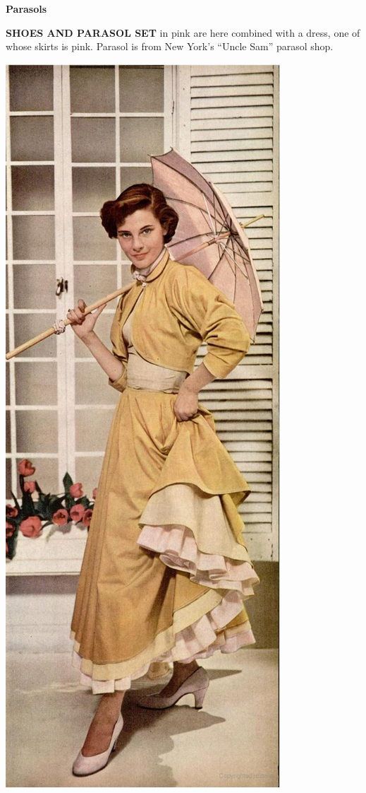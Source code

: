 \begin{minipage}{\textwidth}
\begin{minipage}[b][\textheight][b]{.47\linewidth}
\centerline{\bfseries\Huge Parasols}
\vspace{2\baselineskip}

\begin{quote}
\lipsum[2]
\end{quote}

\vfill

\textbf{SHOES AND PARASOL SET} in pink are here combined with a dress, one of whose skirts is pink. Parasol is from New York's ``Uncle Sam'' parasol shop.
\end{minipage}\hspace*{1cm}
\begin{minipage}[b]{.53\linewidth}
\mbox{}
\includegraphics[width=\linewidth]{./images/parasol-01.jpg}\par
\end{minipage}
\end{minipage}


\clearpage